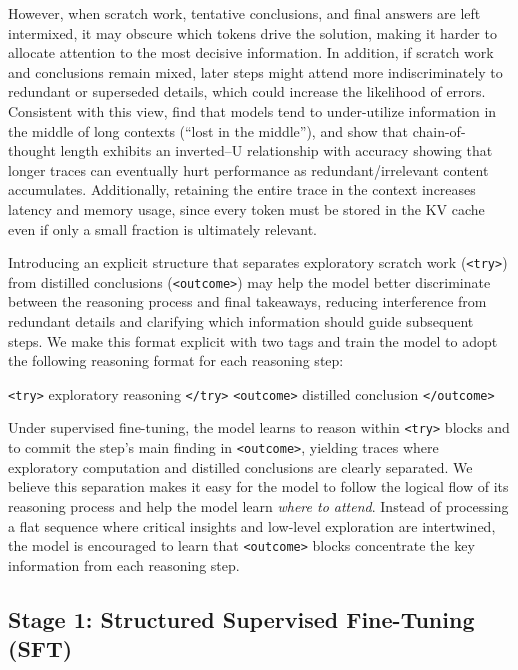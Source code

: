 \documentclass{article}
\begin{document}
However, when scratch work, tentative conclusions, and final answers are left intermixed, it may obscure which tokens drive the solution, making it harder to allocate attention to the most decisive information. In addition, if scratch work and conclusions remain mixed, later steps might attend more indiscriminately to redundant or superseded details, which could increase the likelihood of errors. Consistent with this view, \citet{liu2023lost} find that models tend to under-utilize information in the middle of long contexts (“lost in the middle”), and \citet{wu2025more} show that chain-of-thought length exhibits an inverted–U relationship with accuracy showing that longer traces can eventually hurt performance as redundant/irrelevant content accumulates. Additionally, retaining the entire trace in the context increases latency and memory usage, since every token must be stored in the KV cache even if only a small fraction is ultimately relevant. 

Introducing an explicit structure that separates exploratory scratch work (\texttt{<try>}) from distilled conclusions (\texttt{<outcome>}) may help the model better discriminate between the reasoning process and final takeaways, reducing interference from redundant details and clarifying which information should guide subsequent steps. We make this format explicit with two tags and train the model to adopt the following reasoning format for each reasoning step:
\begin{center}
\texttt{<try>} exploratory reasoning \texttt{</try>} \quad \texttt{<outcome>} distilled conclusion \texttt{</outcome>}
\end{center}

Under supervised fine-tuning, the model learns to reason within \texttt{<try>} blocks and to commit the step’s main finding in \texttt{<outcome>}, yielding traces where exploratory computation and distilled conclusions are clearly separated. We believe this separation makes it easy for the model to follow the logical flow of its reasoning process and help the model learn \emph{where to attend}. Instead of processing a flat sequence where critical insights and low-level exploration are intertwined, the model is encouraged to learn that \texttt{<outcome>} blocks concentrate the key information from each reasoning step.



\subsection{Stage 1: Structured Supervised Fine-Tuning (SFT)}
\end{document}
